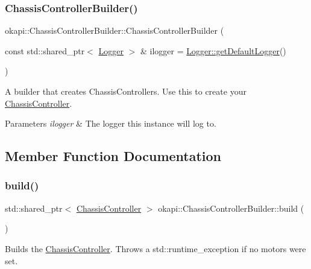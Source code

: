 \subsubsection{\texorpdfstring{ChassisControllerBuilder()}{ChassisControllerBuilder()}}
{\footnotesize\ttfamily okapi\+::\+Chassis\+Controller\+Builder\+::\+Chassis\+Controller\+Builder (\begin{DoxyParamCaption}\item[{const std\+::shared\+\_\+ptr$<$ \mbox{\hyperlink{classokapi_1_1Logger}{Logger}} $>$ \&}]{ilogger = {\ttfamily \mbox{\hyperlink{classokapi_1_1Logger_a5053cf778b4b55acba788a3797dc96d2}{Logger\+::get\+Default\+Logger}}()} }\end{DoxyParamCaption})\hspace{0.3cm}{\ttfamily [explicit]}}

A builder that creates Chassis\+Controllers. Use this to create your \mbox{\hyperlink{classokapi_1_1ChassisController}{Chassis\+Controller}}.


\begin{DoxyParams}{Parameters}
{\em ilogger} & The logger this instance will log to. \\
\hline
\end{DoxyParams}


\subsection{Member Function Documentation}
\mbox{\label{classokapi_1_1ChassisControllerBuilder_a5dfd1f4d60a3c4bfcc28a57211c1a6a2}} 
\subsubsection{\texorpdfstring{build()}{build()}}
{\footnotesize\ttfamily std\+::shared\+\_\+ptr$<$ \mbox{\hyperlink{classokapi_1_1ChassisController}{Chassis\+Controller}} $>$ okapi\+::\+Chassis\+Controller\+Builder\+::build (\begin{DoxyParamCaption}{ }\end{DoxyParamCaption})}

Builds the \mbox{\hyperlink{classokapi_1_1ChassisController}{Chassis\+Controller}}. Throws a std\+::runtime\+\_\+exception if no motors were set.

